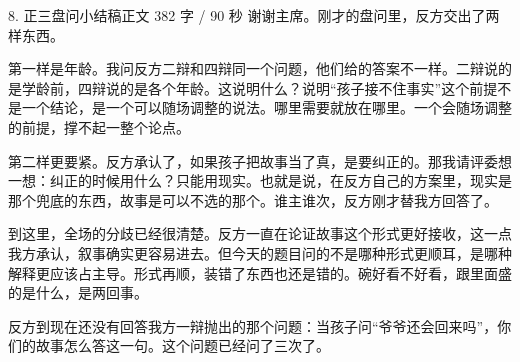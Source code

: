 \documentclass[script,pro]{debate}
\begin{document}
\begin{speech}{8. 正三盘问小结稿}{正文 382 字 / 90 秒}
谢谢主席。刚才的盘问里，反方交出了两样东西。

第一样是年龄。我问反方二辩和四辩同一个问题，他们给的答案不一样。二辩说的是学龄前，四辩说的是各个年龄。这说明什么？说明“孩子接不住事实”这个前提不是一个结论，是一个可以随场调整的说法。哪里需要就放在哪里。一个会随场调整的前提，撑不起一整个论点。

第二样更要紧。反方承认了，如果孩子把故事当了真，是要纠正的。那我请评委想一想：纠正的时候用什么？只能用现实。也就是说，在反方自己的方案里，现实是那个兜底的东西，故事是可以不选的那个。谁主谁次，反方刚才替我方回答了。

到这里，全场的分歧已经很清楚。反方一直在论证故事这个形式更好接收，这一点我方承认，叙事确实更容易进去。但今天的题目问的不是哪种形式更顺耳，是哪种解释更应该占主导。形式再顺，装错了东西也还是错的。碗好看不好看，跟里面盛的是什么，是两回事。

反方到现在还没有回答我方一辩抛出的那个问题：当孩子问“爷爷还会回来吗”，你们的故事怎么答这一句。这个问题已经问了三次了。

\end{speech}
\end{document}
